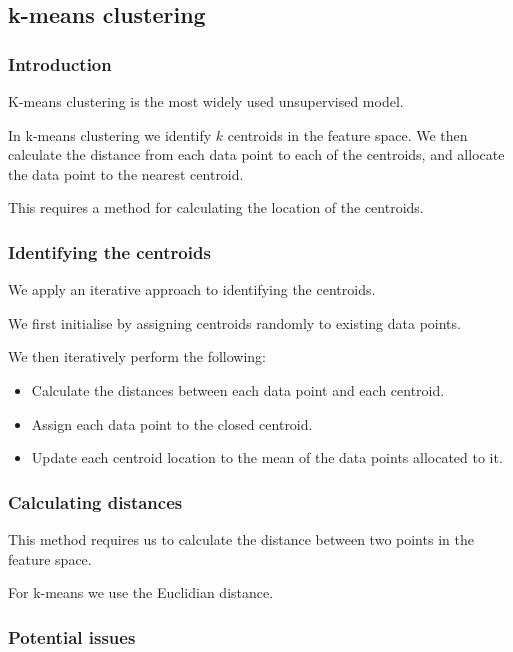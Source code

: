 
\subsection{k-means clustering}

\subsubsection{Introduction}

K-means clustering is the most widely used unsupervised model.

In k-means clustering we identify \(k\) centroids in the feature space. We then calculate the distance from each data point to each of the centroids, and allocate the data point to the nearest centroid.

This requires a method for calculating the location of the centroids.

\subsubsection{Identifying the centroids}

We apply an iterative approach to identifying the centroids.

We first initialise by assigning centroids randomly to existing data points.

We then iteratively perform the following:

\begin{itemize}
\item Calculate the distances between each data point and each centroid.
\item Assign each data point to the closed centroid.
\item Update each centroid location to the mean of the data points allocated to it.
\end{itemize}

\subsubsection{Calculating distances}

This method requires us to calculate the distance between two points in the feature space.

For k-means we use the Euclidian distance.

\subsubsection{Potential issues}

